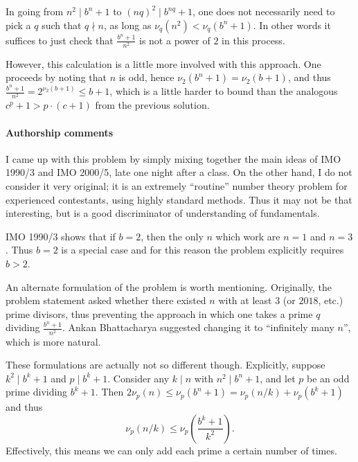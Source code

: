 \documentclass[11pt,twoside]{scrartcl}
\begin{document}
\begin{remark*}
    In going from $n^2 \mid b^{n}+1$ to $(nq)^2 \mid b^{nq} + 1$,
    one does not necessarily need to pick a $q$ such that
    $q \nmid n$, as long as $\nu_q(n^2) < \nu_q(b^n+1)$.
    In other words it suffices to just
    check that $\frac{b^n+1}{n^2}$ is not a power of $2$ in this process.

    However, this calculation is a little more involved with this approach.
    One proceeds by noting that $n$ is odd,
    hence $\nu_2(b^n+1) = \nu_2(b+1)$,
    and thus $\frac{b^n+1}{n^2} = 2^{\nu_2(b+1)} \le b+1$,
    which is a little harder to bound than the analogous
    $c^p+1 > p \cdot (c+1)$ from the previous solution.
\end{remark*}

\paragraph{Authorship comments}
I came up with this problem by simply
mixing together the main ideas of IMO 1990/3 and IMO 2000/5,
late one night after a class.
On the other hand, I do not consider it very original;
it is an extremely ``routine'' number theory problem
for experienced contestants, using highly standard methods.
Thus it may not be that interesting,
but is a good discriminator of understanding of fundamentals.

IMO 1990/3 shows that if $b=2$,
then the only $n$ which work are $n=1$ and $n=3$.
Thus $b = 2$ is a special case
and for this reason the problem explicitly requires $b > 2$.

An alternate formulation of the problem is worth mentioning.
Originally, the problem statement asked whether there existed
$n$ with at least $3$ (or $2018$, etc.) prime divisors,
thus preventing the approach in which one takes
a prime $q$ dividing $\frac{b^n+1}{n^2}$.
Ankan Bhattacharya suggested changing it to ``infinitely many $n$'',
which is more natural.

These formulations are actually not so different though.
Explicitly, suppose $k^2 \mid b^{k}+1$ and $p \mid b^k+1$.
Consider any $k \mid n$ with $n^2 \mid b^n+1$,
and let $p$ be an odd prime dividing $b^k+1$.
Then $2\nu_p(n) \le \nu_p(b^n+1) = \nu_p(n/k) + \nu_p(b^k+1)$
and thus
\[ \nu_p(n/k) \le \nu_p\left( \frac{b^k+1}{k^2} \right). \]
Effectively, this means we can only add each prime a certain number of times.
\end{document}
